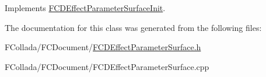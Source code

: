 Implements \hyperlink{classFCDEffectParameterSurfaceInit_ad0109233e63c892e5963a3ca67f7108f}{FCDEffectParameterSurfaceInit}.



The documentation for this class was generated from the following files:\begin{DoxyCompactItemize}
\item 
FCollada/FCDocument/\hyperlink{FCDEffectParameterSurface_8h}{FCDEffectParameterSurface.h}\item 
FCollada/FCDocument/FCDEffectParameterSurface.cpp\end{DoxyCompactItemize}
